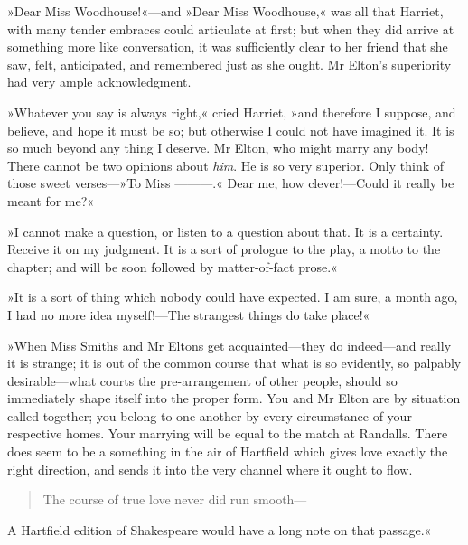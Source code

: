 »Dear Miss Woodhouse!«—and »Dear Miss Woodhouse,« was all that Harriet, with many tender embraces could articulate at first; but when they did arrive at something more like conversation, it was sufficiently clear to her friend that she saw, felt, anticipated, and remembered just as she ought. Mr Elton's superiority had very ample acknowledgment.

»Whatever you say is always right,« cried Harriet, »and therefore I suppose, and believe, and hope it must be so; but otherwise I could not have imagined it. It is so much beyond any thing I deserve. Mr Elton, who might marry any body! There cannot be two opinions about \textit{him}. He is so very superior. Only think of those sweet verses—»To Miss ———.« Dear me, how clever!—Could it really be meant for me?«

»I cannot make a question, or listen to a question about that. It is a certainty. Receive it on my judgment. It is a sort of prologue to the play, a motto to the chapter; and will be soon followed by matter-of-fact prose.«

»It is a sort of thing which nobody could have expected. I am sure, a month ago, I had no more idea myself!—The strangest things do take place!«

»When Miss Smiths and Mr Eltons get acquainted—they do indeed—and really it is strange; it is out of the common course that what is so evidently, so palpably desirable—what courts the pre-arrangement of other people, should so immediately shape itself into the proper form. You and Mr Elton are by situation called together; you belong to one another by every circumstance of your respective homes. Your marrying will be equal to the match at Randalls. There does seem to be a something in the air of Hartfield which gives love exactly the right direction, and sends it into the very channel where it ought to flow.

\begin{quote}
The course of true love never did run smooth—
\end{quote}

 \makeatletter
{}
{%
	


}{%
	\enlargethispage{\baselineskip}
	
}
\makeatother

A Hartfield edition of Shakespeare would have a long note on that passage.«


